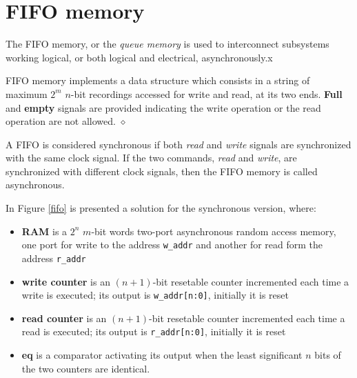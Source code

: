 \chapter{FIFO memory}\label{fifoMem}


The FIFO memory, or the {\em queue memory} is used to interconnect
subsystems working logical, or both logical and electrical,
asynchronously.x

\begin{definition}
FIFO memory implements a data structure which consists in a string
of maximum $2^{m}$ $n$-bit recordings accessed for write and read,
at its two ends. {\bf Full} and {\bf empty} signals are provided
indicating the write operation or the read operation are not
allowed. $\diamond$
\end{definition}


A FIFO is considered synchronous if both {\em read} and {\em
write} signals are synchronized with the same clock signal. If the
two commands, {\em read} and {\em write}, are synchronized with
different clock signals, then the FIFO memory is called
asynchronous.

In Figure \ref{fifo} is presented a solution for the synchronous
version, where:
\begin{itemize}
    \item {\bf RAM} is a $2^{n}$ $m$-bit words two-port asynchronous random access memory, one
    port for write to the address {\tt w\_addr} and another for
    read form the address {\tt r\_addr}
    \item {\bf write counter} is an $(n+1)$-bit resetable counter incremented
    each time a write is executed; its output is {\tt w\_addr[n:0]}, initially
    it is reset
    \item {\bf read counter} is an $(n+1)$-bit resetable counter incremented
    each time a read is executed; its output is {\tt r\_addr[n:0]}, initially it is reset
    \item {\bf eq} is a comparator activating its output when
    the least significant $n$ bits of the two counters are
    identical.
\end{itemize}

